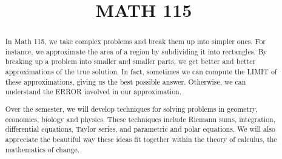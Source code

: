 \documentclass{xourse}
\title{MATH 115}
\begin{document}
  
\begin{abstract} %
In Math 115, we take complex problems and break them up into simpler ones. For instance, we approximate the area of a region by subdividing it into rectangles. By breaking up a problem into smaller and smaller parts, we get better and better approximations of the true solution. In fact, sometimes we can compute the LIMIT of these approximations, giving us the best possible answer. Otherwise, we can understand the ERROR involved in our approximation.

Over the semester, we will develop techniques for solving problems in geometry, economics, biology and physics. These techniques include Riemann sums, integration, differential equations, Taylor series, and parametric and polar equations. We will also appreciate the beautiful way these ideas fit together within the theory of calculus, the mathematics of change.
\end{abstract}  
\maketitle  
 
 
\end{document}
